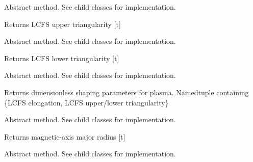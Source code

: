\documentclass[letterpaper,10pt,english]{sphinxmanual}
\begin{document}
\begin{fulllineitems}
\begin{fulllineitems}
\label{eqtools:eqtools.core.Equilibrium.getUpperTriangularity}
Abstract method.  See child classes for implementation.

Returns LCFS upper triangularity {[}t{]}

\end{fulllineitems}


\begin{fulllineitems}
\label{eqtools:eqtools.core.Equilibrium.getLowerTriangularity}
Abstract method.  See child classes for implementation.

Returns LCFS lower triangularity {[}t{]}

\end{fulllineitems}


\begin{fulllineitems}
\label{eqtools:eqtools.core.Equilibrium.getShaping}
Abstract method.  See child classes for implementation.

Returns dimensionless shaping parameters for plasma.
Namedtuple containing \{LCFS elongation, LCFS upper/lower triangularity\}

\end{fulllineitems}


\begin{fulllineitems}
\label{eqtools:eqtools.core.Equilibrium.getMagR}
Abstract method.  See child classes for implementation.

Returns magnetic-axis major radius {[}t{]}

\end{fulllineitems}


\begin{fulllineitems}
\label{eqtools:eqtools.core.Equilibrium.getMagZ}
Abstract method.  See child classes for implementation.


\end{fulllineitems}
\end{fulllineitems}
\end{document}
